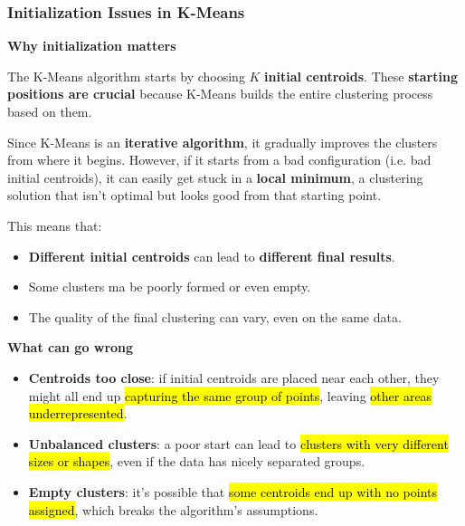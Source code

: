 \subsubsection{Initialization Issues in K-Means}

\begin{flushleft}
    \textcolor{Green3}{ \textbf{Why initialization matters}}
\end{flushleft}
The K-Means algorithm starts by choosing $K$ \textbf{initial centroids}. These \textbf{starting positions are crucial} because K-Means builds the entire clustering process based on them.

\highspace
Since K-Means is an \textbf{iterative algorithm}, it gradually improves the clusters from where it begins. However, if it starts from a bad configuration (i.e. bad initial centroids), it can easily get stuck in a \textbf{local minimum}, a clustering solution that isn't optimal but looks good from that starting point.

\highspace
This means that:
\begin{itemize}
    \item \textbf{Different initial centroids} can lead to \textbf{different final results}.
    \item Some clusters ma be poorly formed or even empty.
    \item The quality of the final clustering can vary, even on the same data.
\end{itemize}

\highspace
\begin{flushleft}
    \textcolor{Red2}{ \textbf{What can go wrong}}
\end{flushleft}
\begin{itemize}
    \item \textbf{Centroids too close}: if initial centroids are placed near each other, they might all end up \hl{capturing the same group of points}, leaving \hl{other areas underrepresented}.
    \item \textbf{Unbalanced clusters}: a poor start can lead to \hl{clusters with very different sizes or shapes}, even if the data has nicely separated groups.
    \item \textbf{Empty clusters}: it's possible that \hl{some centroids end up with no points assigned}, which breaks the algorithm's assumptions.
\end{itemize}

